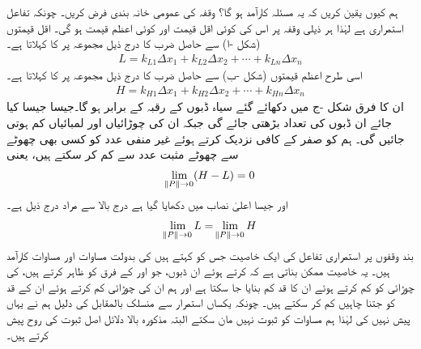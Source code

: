 ہم کیوں یقین کریں کہ یہ مسئلہ کارآمد ہو گا؟ وقفہ  کی عمومی خانہ بندی  فرض کریں۔ چونکہ تفاعل  استمراری ہے لہٰذا ہر ذیلی وقفہ پر اس کی کوئی اقل قیمت   اور کوئی اعظم قیمت  ہو گی۔ اقل قیمتوں (شکل -ا) سے حاصل ضرب  کا درج ذیل مجموعہ  پر  کا   کہلاتا ہے۔
\begin{align*}
L=k_{L1}\Delta x_1+k_{L2}\Delta x_2+\cdots+k_{Ln}\Delta x_n
\end{align*}
اسی طرح  اعظم  قیمتوں (شکل -ب) سے حاصل ضرب  کا درج ذیل مجموعہ  پر  کا   کہلاتا ہے۔
\begin{align*}
H=k_{H1}\Delta x_1+k_{H2}\Delta x_2+\cdots+k_{Hn}\Delta x_n
\end{align*}
ان کا فرق  شکل -ج میں دکھائے گئے سیاہ ڈبوں کے رقبہ کے برابر ہو گا۔جیسا جیسا  کیا جائے ان ڈبوں کی تعداد بڑھتی جائے گی جبکہ ان کی چوڑائیاں اور لمبائیاں کم  ہوتی جائیں گی۔ ہم  کو صفر کے کافی نزدیک کرتے ہوئے غیر منفی عدد  کو کسی بھی چھوٹے سے چھوٹے مثبت عدد  سے کم کر سکتے ہیں، یعنی
\begin{align}\label{مساوات_تکمل_ڈبوں_رقبہ_الف}
\lim_{\norm{P}\to 0}(H-L)=0
\end{align}
اور جیسا اعلیٰ  نصاب میں دکھایا گیا ہے  درج بالا سے مراد درج ذیل ہے۔
\begin{align}\label{مساوات_تکمل_ڈبوں_رقبہ_ب}
\lim_{\norm{P}\to 0}L=\lim_{\norm{P}\to0}H
\end{align}
بند  وقفوں پر استمراری تفاعل کی ایک خاصیت جس کو  کہتے ہیں کی بدولت مساوات  اور مساوات  کارآمد ہیں۔ یہ خاصیت ممکن بناتی ہے کہ  کرتے ہوئے ان ڈبوں، جو  اور  کے فرق کو ظاہر کرتے ہیں،  کی چوڑائی کو کم کرتے ہوئے ان کا قد  کم بنایا جا سکتا ہے اور ہم ان کی چوڑائی کم کرتے ہوئے ان کے قد کو جتنا چاہیں کم کر سکتے ہیں۔ چونکہ یکساں استمرار سے منسلک  بالمقابل  کی دلیل ہم نے یہاں پیش نہیں کی  لہٰذا ہم مساوات   کو ثبوت نہیں مان سکتے   البتہ مذکورہ بالا دلائل اصل ثبوت کی روح پیش کرتے ہیں۔

